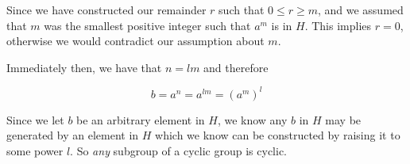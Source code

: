 \documentclass{article}
\begin{document}
Since we have constructed our remainder $r$ such that $0 \leq r \geq m$, and we assumed that $m$ was the smallest positive integer such that $a^m$ is in $H$. This implies $r = 0$, otherwise we would contradict our assumption about $m$.

Immediately then, we have that $n = lm$ and therefore

$$b = a^n = a^{lm} = \left(a^m\right)^l $$

Since we let $b$ be an arbitrary element in $H$, we know any $b$ in $H$ may be generated by an element in $H$ which we know can be constructed by raising it to some power $l$. So \textit{any} subgroup of a cyclic group is cyclic.
\end{document}
